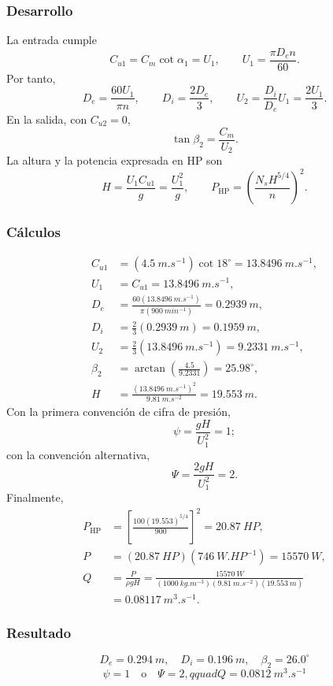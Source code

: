 \documentclass[12pt]{article}
\newcommand{\resultado}[1]{\[
  \boxed{\displaystyle #1}
\]}
\begin{document}
\subsubsection*{Desarrollo}
La entrada cumple
\[
C_{u1}=C_m\cot\alpha_1=U_1,
\qquad U_1=\frac{\pi D_en}{60}.
\]
Por tanto,
\[
D_e=\frac{60U_1}{\pi n},\qquad D_i=\frac{2D_e}{3},
\qquad U_2=\frac{D_i}{D_e}U_1=\frac{2U_1}{3}.
\]
En la salida, con $C_{u2}=0$,
\[
\tan\beta_2=\frac{C_m}{U_2}.
\]
La altura y la potencia expresada en HP son
\[
H=\frac{U_1C_{u1}}{g}=\frac{U_1^2}{g},\qquad
P_{\mathrm{HP}}=\left(\frac{N_sH^{5/4}}{n}\right)^2.
\]

\subsubsection*{Cálculos}
\begin{align*}
C_{u1}&=(\SI{4.5}{m.s^{-1}})\cot18^\circ
=\SI{13.8496}{m.s^{-1}},\\
U_1&=C_{u1}=\SI{13.8496}{m.s^{-1}},\\
D_e&=\frac{60(\SI{13.8496}{m.s^{-1}})}
{\pi(\SI{900}{min^{-1}})}=\SI{0.2939}{m},\\
D_i&=\frac{2}{3}(\SI{0.2939}{m})=\SI{0.1959}{m},\\
U_2&=\frac{2}{3}(\SI{13.8496}{m.s^{-1}})=\SI{9.2331}{m.s^{-1}},\\
\beta_2&=\arctan\left(\frac{4.5}{9.2331}\right)=25.98^\circ,\\
H&=\frac{(\SI{13.8496}{m.s^{-1}})^2}{\SI{9.81}{m.s^{-2}}}
=\SI{19.553}{m}.
\end{align*}
Con la primera convención de cifra de presión,
\[
\psi=\frac{gH}{U_1^2}=1;
\]
con la convención alternativa,
\[
\Psi=\frac{2gH}{U_1^2}=2.
\]
Finalmente,
\begin{align*}
P_{\mathrm{HP}}
&=\left[\frac{100(19.553)^{5/4}}{900}\right]^2
=\SI{20.87}{HP},\\
P&=(\SI{20.87}{HP})(\SI{746}{W.HP^{-1}})=\SI{15570}{W},\\
Q&=\frac{P}{\rho gH}
=\frac{\SI{15570}{W}}
{(\SI{1000}{kg.m^{-3}})(\SI{9.81}{m.s^{-2}})(\SI{19.553}{m})}\\
&=\SI{0.08117}{m^3.s^{-1}}.
\end{align*}

\subsubsection*{Resultado}
\resultado{D_e=\SI{0.294}{m},\quad D_i=\SI{0.196}{m},\quad
\beta_2=26.0^\circ}
\resultado{\psi=1\quad\text{o}\quad\Psi=2,qquad
Q=\SI{0.0812}{m^3.s^{-1}}}
\end{document}
